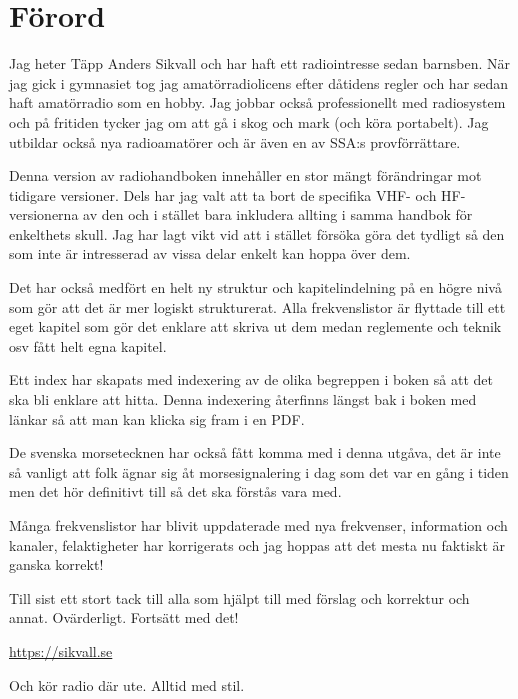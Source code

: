 
\section*{Förord}

Jag heter Täpp Anders Sikvall och har haft ett radiointresse sedan barnsben.
När jag gick i gymnasiet tog jag amatörradiolicens efter dåtidens regler och
har sedan haft amatörradio som en hobby. Jag jobbar också professionellt med
radiosystem och på fritiden tycker jag om att gå i skog och mark (och köra
portabelt). Jag utbildar också nya radioamatörer och är även en av SSA:s
provförrättare.

Denna version av radiohandboken innehåller en stor mängt förändringar mot
tidigare versioner. Dels har jag valt att ta bort de specifika VHF- och
HF-versionerna av den och i stället bara inkludera allting i samma handbok för
enkelthets skull. Jag har lagt vikt vid att i stället försöka göra det tydligt
så den som inte är intresserad av vissa delar enkelt kan hoppa över dem.

Det har också medfört en helt ny struktur och kapitelindelning på en högre
nivå som gör att det är mer logiskt strukturerat. Alla frekvenslistor är
flyttade till ett eget kapitel som gör det enklare att skriva ut dem medan
reglemente och teknik osv fått helt egna kapitel.

Ett index har skapats med indexering av de olika begreppen i boken så att det
ska bli enklare att hitta. Denna indexering återfinns längst bak i boken med
länkar så att man kan klicka sig fram i en PDF.

De svenska morsetecknen har också fått komma med i denna utgåva, det
är inte så vanligt att folk ägnar sig åt morsesignalering i dag som
det var en gång i tiden men det hör definitivt till så det ska förstås
vara med.

Många frekvenslistor har blivit uppdaterade med nya frekvenser, information
och kanaler, felaktigheter har korrigerats och jag hoppas att det mesta nu
faktiskt är ganska korrekt!

Till sist ett stort tack till alla som hjälpt till med förslag och korrektur
och annat. Ovärderligt. Fortsätt med det!

\url{https://sikvall.se}

Och kör radio där ute. Alltid med stil.

\vspace{4mm}


